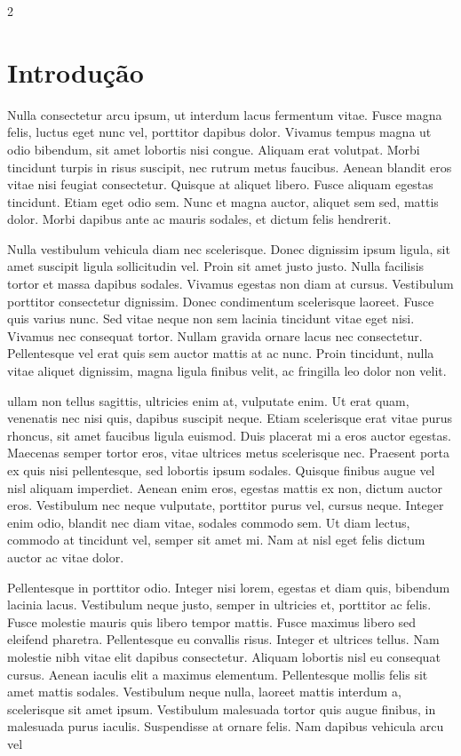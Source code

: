 \documentclass[twoside]{article}
\begin{document}
\begin{multicols}{2}

\section{Introdução}

Nulla consectetur arcu ipsum, ut interdum lacus fermentum vitae. Fusce magna felis, luctus eget nunc vel, porttitor dapibus dolor. Vivamus tempus magna ut odio bibendum, sit amet lobortis nisi congue. Aliquam erat volutpat. Morbi tincidunt turpis in risus suscipit, nec rutrum metus faucibus. Aenean blandit eros vitae nisi feugiat consectetur. Quisque at aliquet libero. Fusce aliquam egestas tincidunt. Etiam eget odio sem. Nunc et magna auctor, aliquet sem sed, mattis dolor. Morbi dapibus ante ac mauris sodales, et dictum felis hendrerit.

Nulla vestibulum vehicula diam nec scelerisque. Donec dignissim ipsum ligula, sit amet suscipit ligula sollicitudin vel. Proin sit amet justo justo. Nulla facilisis tortor et massa dapibus sodales. Vivamus egestas non diam at cursus. Vestibulum porttitor consectetur dignissim. Donec condimentum scelerisque laoreet. Fusce quis varius nunc. Sed vitae neque non sem lacinia tincidunt vitae eget nisi. Vivamus nec consequat tortor. Nullam gravida ornare lacus nec consectetur. Pellentesque vel erat quis sem auctor mattis at ac nunc. Proin tincidunt, nulla vitae aliquet dignissim, magna ligula finibus velit, ac fringilla leo dolor non velit.

ullam non tellus sagittis, ultricies enim at, vulputate enim. Ut erat quam, venenatis nec nisi quis, dapibus suscipit neque. Etiam scelerisque erat vitae purus rhoncus, sit amet faucibus ligula euismod. Duis placerat mi a eros auctor egestas. Maecenas semper tortor eros, vitae ultrices metus scelerisque nec. Praesent porta ex quis nisi pellentesque, sed lobortis ipsum sodales. Quisque finibus augue vel nisl aliquam imperdiet. Aenean enim eros, egestas mattis ex non, dictum auctor eros. Vestibulum nec neque vulputate, porttitor purus vel, cursus neque. Integer enim odio, blandit nec diam vitae, sodales commodo sem. Ut diam lectus, commodo at tincidunt vel, semper sit amet mi. Nam at nisl eget felis dictum auctor ac vitae dolor.

Pellentesque in porttitor odio. Integer nisi lorem, egestas et diam quis, bibendum lacinia lacus. Vestibulum neque justo, semper in ultricies et, porttitor ac felis. Fusce molestie mauris quis libero tempor mattis. Fusce maximus libero sed eleifend pharetra. Pellentesque eu convallis risus. Integer et ultrices tellus. Nam molestie nibh vitae elit dapibus consectetur. Aliquam lobortis nisl eu consequat cursus. Aenean iaculis elit a maximus elementum. Pellentesque mollis felis sit amet mattis sodales. Vestibulum neque nulla, laoreet mattis interdum a, scelerisque sit amet ipsum. Vestibulum malesuada tortor quis augue finibus, in malesuada purus iaculis. Suspendisse at ornare felis. Nam dapibus vehicula arcu vel


\end{multicols}
\end{document}
